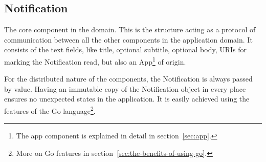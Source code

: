 \subsection{Notification}\label{sec:notification}

The core component in the domain.
This is the structure
acting as a protocol of communication
between all the other components
in the application domain.
It consists of the text fields,
like title, optional subtitle, optional body,
\acp{URI} for marking the Notification read,
but also an App\footnote{
  The app component is explained in detail in section~\ref{sec:app}.
} of origin.

For the distributed nature of the components,
the Notification is always passed by value.
Having an immutable copy of the Notification object
in every place ensures
no unexpected states in the application.
It is easily achieved
using the features of
the Go language\footnote{
  More on Go features in section~\ref{sec:the-benefits-of-using-go}.
}.
